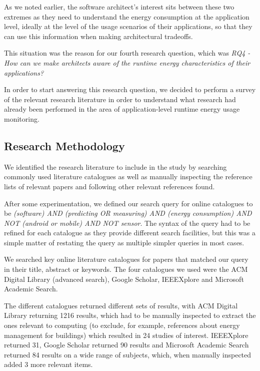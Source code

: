 As we noted earlier, the software architect's interest sits between these two extremes as they need to understand the energy consumption at the application level, ideally at the level of the usage scenarios of their applications, so that they can use this information when making architectural tradeoffs.

This situation was the reason for our fourth research question, which was \emph{
RQ4 - How can we make architects aware of the runtime energy characteristics of their applications?}

In order to start answering this research question, we decided to perform a survey of the relevant research literature in order to understand what research had already been performed in the area of application-level runtime energy usage monitoring.

\subsection{Research Methodology}

We identified the research literature to include in the study by searching commonly used literature catalogues as well as manually inspecting the reference lists of relevant papers and following other relevant references found.

After some experimentation, we defined our search query for online catalogues to be \emph{(software) AND (predicting OR measuring) AND (energy consumption) AND NOT (android or mobile) AND NOT sensor}.  The syntax of the query had to be refined for each catalogue as they provide different search facilities, but this was a simple matter of restating the query as multiple simpler queries in most cases.

We searched key online literature catalogues for papers that matched our query in their title, abstract or keywords.  The four catalogues we used were the ACM Digital Library (advanced search), Google Scholar, IEEEXplore and Microsoft Academic Search.

The different catalogues returned different sets of results, with ACM Digital Library returning 1216 results, which had to be manually inspected to extract the ones relevant to computing (to exclude, for example, references about energy management for buildings) which resulted in 24 studies of interest.  IEEEXplore returned 31, Google Scholar returned 90 results and Microsoft Academic Search returned 84 results on a wide range of subjects, which, when manually inspected added 3 more relevant items.


